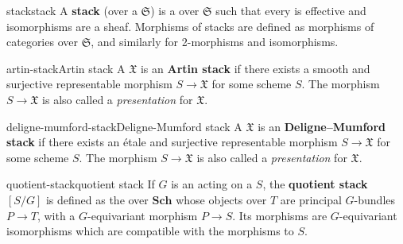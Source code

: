\begin{topic}{stack}{stack}
    A \textbf{stack} (over a  $\mathfrak{S}$) is a  over $\mathfrak{S}$ such that every  is effective and isomorphisms are a sheaf. Morphisms of stacks are defined as morphisms of categories over $\mathfrak{S}$, and similarly for 2-morphisms and isomorphisms.
\end{topic}

\begin{topic}{artin-stack}{Artin stack}
    A  $\mathfrak{X}$ is an \textbf{Artin stack} if there exists a smooth and surjective representable morphism $S \to \mathfrak{X}$ for some scheme $S$. The morphism $S \to \mathfrak{X}$ is also called a \textit{presentation} for $\mathfrak{X}$.
\end{topic}

\begin{topic}{deligne-mumford-stack}{Deligne-Mumford stack}
    A  $\mathfrak{X}$ is an \textbf{Deligne--Mumford stack} if there exists an étale and surjective representable morphism $S \to \mathfrak{X}$ for some scheme $S$. The morphism $S \to \mathfrak{X}$ is also called a \textit{presentation} for $\mathfrak{X}$.
\end{topic}

\begin{topic}{quotient-stack}{quotient stack}
    If $G$ is an  acting on a  $S$, the \textbf{quotient stack} $[S/G]$ is defined as the  over $\textbf{Sch}$ whose objects over $T$ are principal $G$-bundles $P \to T$, with a $G$-equivariant morphism $P \to S$. Its morphisms are $G$-equivariant isomorphisms which are compatible with the morphisms to $S$.
\end{topic}
